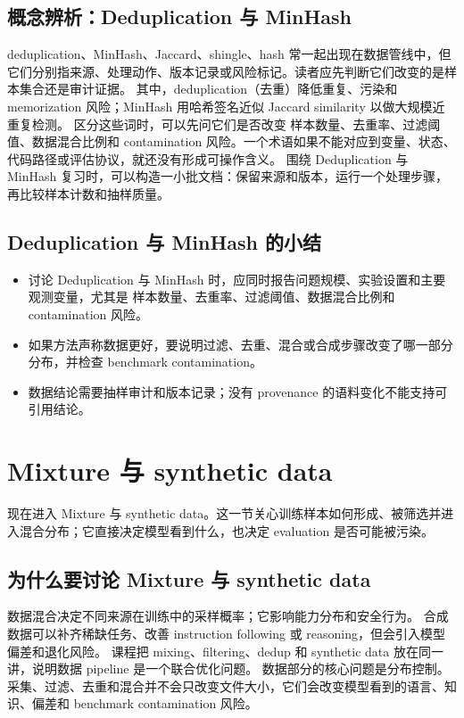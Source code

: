 \documentclass[a4paper]{article}
\begin{document}
\subsection{概念辨析：Deduplication 与 MinHash}
deduplication、MinHash、Jaccard、shingle、hash 常一起出现在数据管线中，但它们分别指来源、处理动作、版本记录或风险标记。读者应先判断它们改变的是样本集合还是审计证据。
其中，deduplication（去重）降低重复、污染和 memorization 风险；MinHash 用哈希签名近似 Jaccard similarity 以做大规模近重复检测。
区分这些词时，可以先问它们是否改变 样本数量、去重率、过滤阈值、数据混合比例和 contamination 风险。一个术语如果不能对应到变量、状态、代码路径或评估协议，就还没有形成可操作含义。
围绕 Deduplication 与 MinHash 复习时，可以构造一小批文档：保留来源和版本，运行一个处理步骤，再比较样本计数和抽样质量。
\subsection{Deduplication 与 MinHash 的小结}
\begin{itemize}
\item 讨论 Deduplication 与 MinHash 时，应同时报告问题规模、实验设置和主要观测变量，尤其是 样本数量、去重率、过滤阈值、数据混合比例和 contamination 风险。
\item 如果方法声称数据更好，要说明过滤、去重、混合或合成步骤改变了哪一部分分布，并检查 benchmark contamination。
\item 数据结论需要抽样审计和版本记录；没有 provenance 的语料变化不能支持可引用结论。
\end{itemize}
\section{Mixture 与 synthetic data}
现在进入 Mixture 与 synthetic data。这一节关心训练样本如何形成、被筛选并进入混合分布；它直接决定模型看到什么，也决定 evaluation 是否可能被污染。
\subsection{为什么要讨论 Mixture 与 synthetic data}
数据混合决定不同来源在训练中的采样概率；它影响能力分布和安全行为。
合成数据可以补齐稀缺任务、改善 instruction following 或 reasoning，但会引入模型偏差和退化风险。
课程把 mixing、filtering、dedup 和 synthetic data 放在同一讲，说明数据 pipeline 是一个联合优化问题。
数据部分的核心问题是分布控制。采集、过滤、去重和混合并不会只改变文件大小，它们会改变模型看到的语言、知识、偏差和 benchmark contamination 风险。
\end{document}
